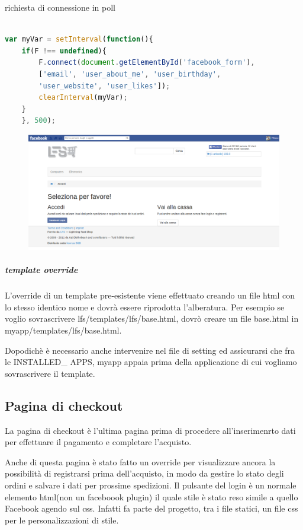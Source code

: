richiesta di connessione in poll 

\begin{lstlisting}[language=JavaScript]

var myVar = setInterval(function(){
    if(F !== undefined){
        F.connect(document.getElementById('facebook_form'), 
        ['email', 'user_about_me', 'user_birthday', 
        'user_website', 'user_likes']);
        clearInterval(myVar);
    }
    }, 500);

\end{lstlisting}

\begin{figure}
\includegraphics[width=0.9\columnwidth]{img/checkout}
\end{figure}

\subparagraph{template override}
L'override di un template pre-esistente viene effettuato creando un file html con lo stesso identico nome e dovrà essere riprodotta l'alberatura. Per esempio se voglio sovrascrivere lfs/templates/lfs/base.html, dovrò creare un file base.html in myapp/templates/lfs/base.html. 

Dopodichè è necessario anche intervenire nel file di setting ed assicurarsi che fra le INSTALLED\_ APPS, myapp appaia prima della applicazione di cui vogliamo sovrascrivere il template.

\subsection{Pagina di checkout}
La pagina di checkout è l'ultima pagina prima di procedere all'inserimenrto dati per effettuare il pagamento e completare l'acquisto.

Anche di questa pagina è stato fatto un override per visualizzare ancora la possibilità di registrarsi prima dell'acquisto, in modo da gestire lo stato degli ordini e salvare i dati per prossime spedizioni. Il pulsante del login è un normale elemento html(non un faceboook plugin) il quale stile è stato reso simile a quello Facebook agendo sul css. Infatti fa parte del progetto, tra i file statici, un file css per le personalizzazioni di stile.

